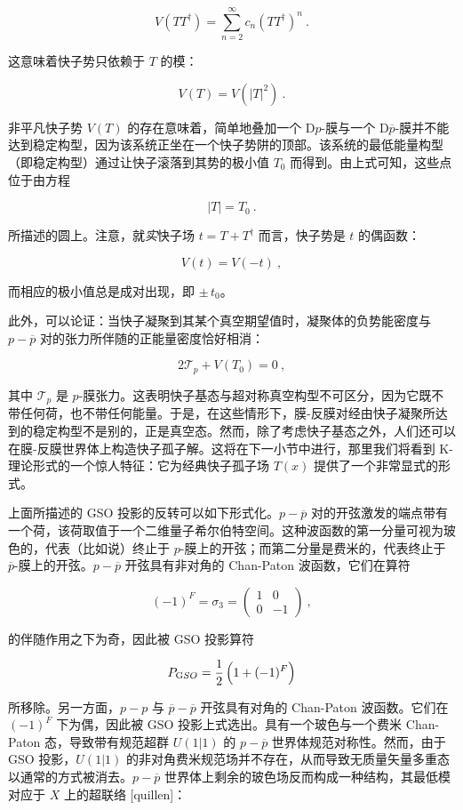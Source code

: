 \documentclass[11pt,a4paper]{ctexart}
\begin{document}
\[V(TT^\dagger)=\sum_{n=2}^{\infty}c_n\left(TT^\dagger\right)^n \ .\]

这意味着快子势只依赖于 \(T\) 的模：

\[V(T)=V(|T|^2)\ .\]

非平凡快子势 \(V(T)\) 的存在意味着，简单地叠加一个 D\(p\)-膜与一个 D\(\overline{p}\)-膜并不能达到稳定构型，因为该系统正坐在一个快子势阱的顶部。该系统的最低能量构型（即稳定构型）通过让快子滚落到其势的极小值 \(T_0\) 而得到。由上式可知，这些点位于由方程

\[|T|=T_0 \ .\]

所描述的圆上。注意，就\emph{实}快子场 \(t=T+T^\dagger\) 而言，快子势是 \(t\) 的偶函数：

\[V(t)=V(-t)\ ,\]

而相应的极小值总是成对出现，即 \(\pm\,t_0\)。

此外，可以论证：当快子凝聚到其某个真空期望值时，凝聚体的负势能密度与 \(p-\overline{p}\) 对的张力所伴随的正能量密度恰好相消：

\[2{\mathcal T}_p+V(T_0)=0\ ,\]

其中 \({\mathcal T}_p\) 是 \(p\)-膜张力。这表明快子基态与超对称真空构型不可区分，因为它既不带任何荷，也不带任何能量。于是，在这些情形下，膜-反膜对经由快子凝聚所达到的稳定构型不是别的，正是真空态。然而，除了考虑快子基态之外，人们还可以在膜-反膜世界体上构造快子孤子解。这将在下一小节中进行，那里我们将看到 K-理论形式的一个惊人特征：它为经典快子孤子场 \(T(x)\) 提供了一个非常显式的形式。

上面所描述的 GSO 投影的反转可以如下形式化。\(p-\overline{p}\) 对的开弦激发的端点带有一个荷，该荷取值于一个二维量子希尔伯特空间。这种波函数的第一分量可视为玻色的，代表（比如说）终止于 \(p\)-膜上的开弦；而第二分量是费米的，代表终止于 \(\overline{p}\)-膜上的开弦。\(p-\overline{p}\) 开弦具有非对角的 Chan-Paton 波函数，它们在算符

\[(-1)^F=\sigma_3=\left(\begin{array}{cc}1
& 0\\ 0 &- 1\end{array}\right)\ ,\]

的伴随作用之下为奇，因此被 GSO 投影算符

\[P_{\mathrm GSO}=\frac12\,\Bigl(1+(-1)^F\Bigr)\]

所移除。另一方面，\(p-p\) 与 \(\overline{p}-\overline{p}\) 开弦具有对角的 Chan-Paton 波函数。它们在 \((-1)^F\) 下为偶，因此被 GSO 投影上式选出。具有一个玻色与一个费米 Chan-Paton 态，导致带有规范超群 \(U(1|1)\) 的 \(p-\overline{p}\) 世界体规范对称性。然而，由于 GSO 投影，\(U(1|1)\) 的非对角费米规范场并不存在，从而导致无质量矢量多重态以通常的方式被消去。\(p-\overline{p}\) 世界体上剩余的玻色场反而构成一种结构，其最低模对应于 \(X\) 上的超联络 [quillen]：
\end{document}
